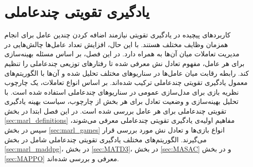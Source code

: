 \chapter{یادگیری تقویتی چندعاملی}\label{ch:marl}
کاربردهای پیچیده در یادگیری تقویتی نیازمند اضافه کردن چندین عامل برای انجام همزمان وظایف مختلف هستند.
با این حال، افزایش تعداد عامل‌ها چالش‌هایی در مدیریت تعاملات میان آن‌ها به همراه دارد.
در این فصل، بر اساس مسئله بهینه‌سازی برای هر عامل، مفهوم تعادل نش معرفی شده تا رفتارهای توزیعی چندعاملی را تنظیم کند.
رابطه رقابت میان عامل‌ها در سناریوهای مختلف تحلیل شده و آن‌ها با الگوریتم‌های معمول یادگیری تقویتی چندعاملی ترکیب شده‌اند. بر اساس انواع تعاملات، یک چارچوب نظریه بازی برای مدل‌سازی عمومی در سناریوهای چندعاملی استفاده شده است. با تحلیل بهینه‌سازی و وضعیت تعادل برای هر بخش از چارچوب، سیاست بهینه یادگیری تقویتی چندعاملی برای هر عامل بررسی شده است. در این فصل ابتدا در بخش \ref{sec:marl_definitions} مفاهیم اولیه‌ی یادگیری تقویتی چندعاملی معرفی می‌شوند،
 سپس در بخش \ref{sec:marl_games} انواع بازی‌ها و تعادل نش مورد بررسی قرار می‌گیرند.
الگوریتم‌های مختلف یادگیری تقویتی چندعاملی شامل
 در بخش
  \ref{sec:marl_maddpg}،
    در بخش \ref{sec:MATD3}،
     در بخش \ref{sec:MASAC} و  در بخش \ref{sec:MAPPO} معرفی و بررسی شده‌اند.
  
    
    
    
    
    
    
     
